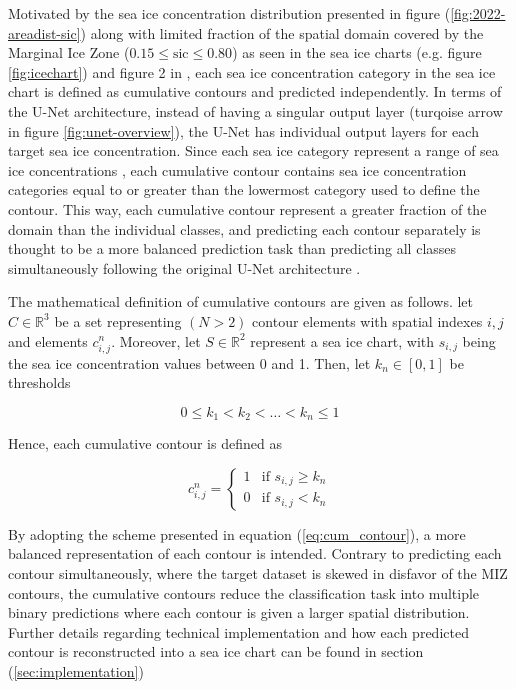 \documentclass[../main/thesis]{subfiles}
\begin{document}
Motivated by the sea ice concentration distribution presented in figure (\ref{fig:2022-areadist-sic}) along with limited fraction of the spatial domain covered by the Marginal Ice Zone ($0.15 \leq \text{sic} \leq 0.80$) as seen in the sea ice charts (e.g. figure \ref{fig:icechart}) and figure 2 in \citet{Strong2012}, each sea ice concentration category in the sea ice chart is defined as cumulative contours and predicted independently. In terms of the U-Net architecture, instead of having a singular output layer (turqoise arrow in figure \ref{fig:unet-overview}), the U-Net has individual output layers for each target sea ice concentration. Since each sea ice category represent a range of sea ice concentrations \citep{Dinessen2020}, each cumulative contour contains sea ice concentration categories equal to or greater than the lowermost category used to define the contour. This way, each cumulative contour represent a greater fraction of the domain than the individual classes, and predicting each contour separately is thought to be a more balanced prediction task than predicting all classes simultaneously following the original U-Net architecture \citep{Ronneberger2015}.

The mathematical definition of cumulative contours are given as follows. let $C \in \mathbb{R}^3$ be a set representing $(N > 2)$ contour elements with spatial indexes $i,j$ and elements $c_{i,j}^n$. Moreover, let $S \in \mathbb{R}^2$ represent a sea ice chart, with $s_{i,j}$ being the sea ice concentration values between 0 and 1. Then, let $k_n \in [0,1]$ be thresholds 

\begin{equation}
    0 \leq k_1 < k_2 < \ldots < k_n \leq 1
\end{equation}

Hence, each cumulative contour is defined as

\begin{equation}
    \label{eq:cum_contour}
    c_{i,j}^n = \begin{cases}
        1 & \text{if } s_{i,j} \geq k_n \\
        0 & \text{if } s_{i,j} < k_n
    \end{cases}
\end{equation}

By adopting the scheme presented in equation (\ref{eq:cum_contour}), a more balanced representation of each contour is intended. Contrary to predicting each contour simultaneously, where the target dataset is skewed in disfavor of the MIZ contours, the cumulative contours reduce the classification task into multiple binary predictions where each contour is given a larger spatial distribution. Further details regarding technical implementation and how each predicted contour is reconstructed into a sea ice chart can be found in section (\ref{sec:implementation})
\end{document}
